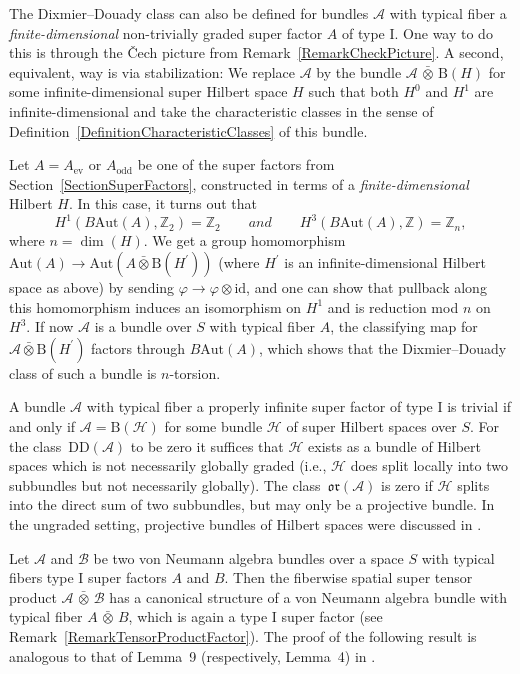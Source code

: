 \documentclass[pdftex]{sigma}
\numberwithin{equation}{section}
\newcommand{\Z}{\mathbb{Z}}
\newcommand{\B}{\mathrm{B}}
\newcommand{\Aut}{\mathrm{Aut}}
\newcommand{\DD}{\mathrm{DD}}
\newcommand{\oclass}{\mathfrak{or}}
\begin{document}
The Dixmier--Douady class can also be defined for bundles $\mathcal{A}$ with typical fiber a \emph{finite-dimensional} non-trivially graded super factor $A$ of type I.
One way to do this is through the \v{C}ech picture from Remark~\ref{RemarkCheckPicture}.
A second, equivalent, way is via stabilization: We replace $\mathcal{A}$ by the bundle $\mathcal{A} \,\bar{\otimes}\, \B(H)$ for some infinite-dimensional super Hilbert space $H$ such that both $H^0$ and $H^1$ are infinite-dimensional and take the characteristic classes in the sense of Definition~\ref{DefinitionCharacteristicClasses} of this bundle.

\begin{Remark}
Let $A = A_{\mathrm{ev}}$ or $A_{\mathrm{odd}}$ be one of the super factors from Section~\ref{SectionSuperFactors}, constructed in terms of a \emph{finite-dimensional} Hilbert $H$.
In this case, it turns out that
\[H^1(B\Aut(A), \Z_2) = \Z_2\qquad and \qquad H^3(B\Aut(A), \Z) = \Z_n,\]
 where $n = \dim(H)$.
We get a group homomorphism $\Aut(A) \to \Aut(A \bar{\otimes} \B(H^\prime))$ (where $H^\prime$ is an infinite-dimensional Hilbert space as above) by sending $\varphi \to \varphi \otimes \mathrm{id}$, and one can show that pullback along this homomorphism induces an isomorphism on $H^1$ and is reduction mod $n$ on~$H^3$.
If now $\mathcal{A}$ is a bundle over $S$ with typical fiber $A$, the classifying map for $\mathcal{A} \bar{\otimes} \B(H^\prime)$ factors through $B\Aut(A)$, which shows that the Dixmier--Douady class of such a bundle is $n$-torsion.
\end{Remark}

\begin{Remark}
A bundle $\mathcal{A}$ with typical fiber a properly infinite super factor of type I is trivial if and only if $\mathcal{A} = \B(\mathcal{H})$ for some bundle $\mathcal{H}$ of super Hilbert spaces over $S$.
For the class~$\DD(\mathcal{A})$ to be zero it suffices that $\mathcal{H}$ exists as a bundle of Hilbert spaces which is not necessarily globally graded (i.e., $\mathcal{H}$ does split locally into two subbundles but not necessarily globally).
The class~$\oclass(\mathcal{A})$ is zero if $\mathcal{H}$ splits into the direct sum of two subbundles, but may only be a projective bundle.
In the ungraded setting, projective bundles of Hilbert spaces were discussed in \cite{AtiyahSegalTwistedKtheory}.
\end{Remark}

Let $\mathcal{A}$ and $\mathcal{B}$ be two von Neumann algebra bundles over a space $S$ with typical fibers type I super factors $A$ and $B$.
Then the fiberwise spatial super tensor product $\mathcal{A} \,\bar{\otimes}\, \mathcal{B}$ has a canonical structure of a von Neumann algebra bundle with typical fiber $A \,\bar{\otimes}\, B$, which is again a type I super factor (see Remark~\ref{RemarkTensorProductFactor}).
The proof of the following result is analogous to that of Lemma~9 (respectively, Lemma~4) in \cite{DonovanKaroubi}.
\end{document}
